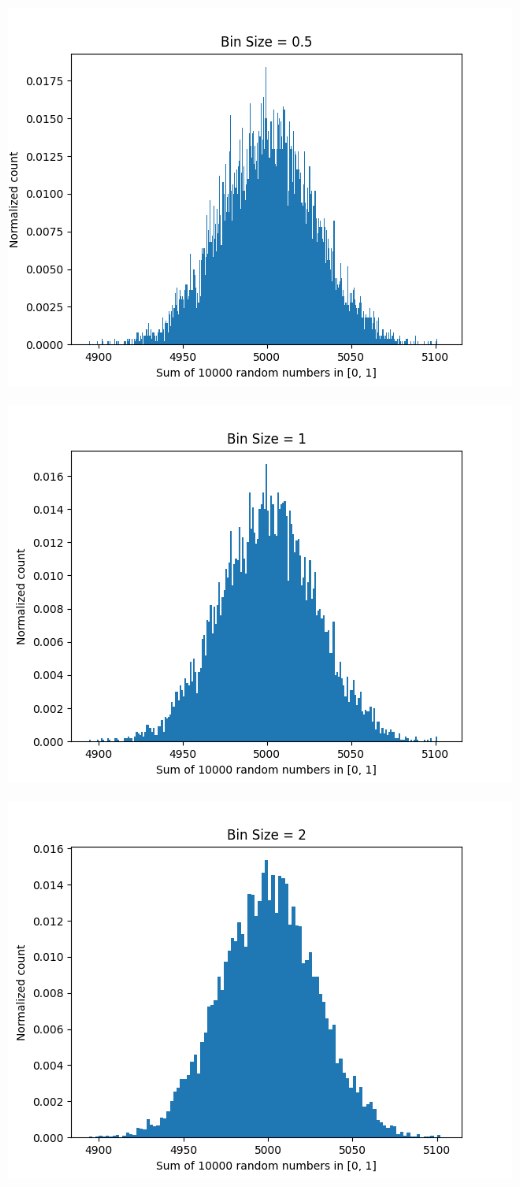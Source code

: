 \documentclass{article}
\begin{document}
\begin{center}
    \includegraphics[scale=0.8]{1h_dx_0_5.png}

    \includegraphics[scale=0.8]{1h_dx_1.png}
    
    \includegraphics[scale=0.8]{1h_dx_2.png}
\end{center}
\end{document}
